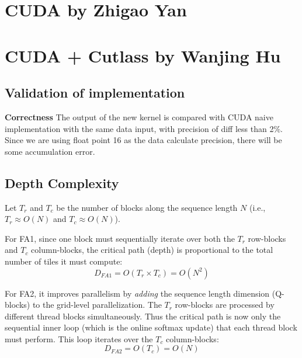 \documentclass[11pt]{article}
\begin{document}

\section{CUDA by Zhigao Yan}

\section{CUDA + Cutlass by Wanjing Hu}

\subsection{Validation of implementation}

\textbf{Correctness} The output of the new kernel is compared with CUDA naive implementation with the same data input, with precision of diff less than 2\%. Since we are using float point 16 as the data calculate precision, there will be some accumulation error.


\subsection{Depth Complexity}

Let $T_r$ and $T_c$ be the number of blocks along the sequence length $N$ (i.e., $T_r \approx O(N)$ and $T_c \approx O(N)$).


For FA1, since one block must sequentially iterate over both the $T_r$ row-blocks and $T_c$ column-blocks, the critical path (depth) is proportional to the total number of tiles it must compute:
              \[ D_{FA1} = O(T_r \times T_c) = O(N^2) \]

For FA2, it improves parallelism by \textit{adding} the sequence length dimension (Q-blocks) to the grid-level parallelization. The $T_r$ row-blocks are processed by different thread blocks simultaneously. Thus the critical path is now only the sequential inner loop (which is the online softmax update) that each thread block must perform. This loop iterates over the $T_c$ column-blocks:
              \[ D_{FA2} = O(T_c) = O(N) \]
\end{document}
